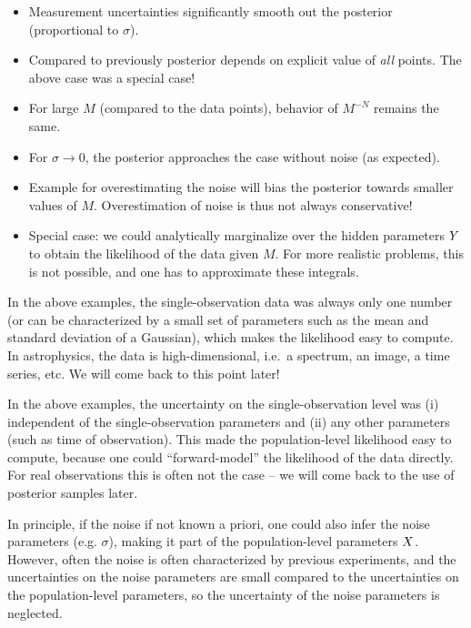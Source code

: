 \documentclass[12pt,a4paper]{article}
\begin{document}
\begin{tcolorbox}[notebox, title={Summary}]
    \begin{itemize}
        \item Measurement uncertainties significantly smooth out the posterior (proportional to $\sigma$). 
        \item Compared to previously posterior depends on explicit value of \textit{all} points. The above case was a special case!
        \item For large $M$ (compared to the data points), behavior of $M ^ {- N}$ remains the same.
        \item For $\sigma \rightarrow 0$, the posterior approaches the case without noise (as expected).
        \item Example for overestimating the noise will bias the posterior towards smaller values of $M$. Overestimation of noise is thus not always conservative! 
        \item Special case: we could analytically marginalize over the hidden parameters $Y$ to obtain the likelihood of the data given $M$. For more realistic problems, this is not possible, and one has to approximate these integrals. 
    \end{itemize}
\end{tcolorbox}


\begin{tcolorbox}[notebox, title={Connection to astrophysics}]
In the above examples, the single-observation data was always only one number (or can be characterized by a small set of parameters such as the mean and standard deviation of a Gaussian), which makes the likelihood easy to compute.
In astrophysics, the data is high-dimensional, i.e.\ a spectrum, an image, a time series, etc. We will come back to this point later!
\end{tcolorbox}

\begin{tcolorbox}[notebox, title={Uncertainties}]
    In the above examples, the uncertainty on the single-observation level was (i) independent of the single-observation parameters and (ii) any other parameters (such as time of observation). 
    This made the population-level likelihood easy to compute, because one could ``forward-model'' the likelihood of the data directly. For real observations this is often not the case -- we will come back to the use of posterior samples later. 

    \vspace{0.2cm}
    In principle, if the noise if not known a priori, one could also infer the noise parameters (e.g. $\sigma$), making it part of the population-level parameters $X$.
    However, often the noise is often characterized by previous experiments, and the uncertainties on the noise parameters are small compared to the uncertainties on the population-level parameters, so the uncertainty of the noise parameters is neglected. 
\end{tcolorbox}
\end{document}
